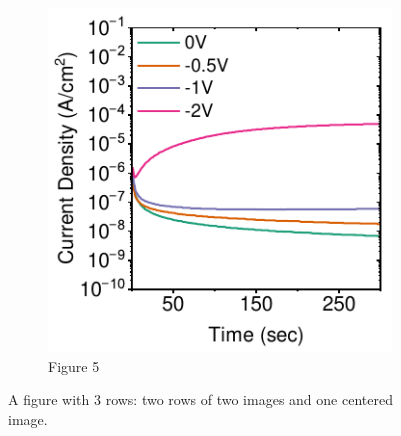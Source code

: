 \begin{figure}[htbp]
    \vspace{1em} %

    \begin{subfigure}[b]{0.45\textwidth}
        \centering
        \includegraphics[width=\textwidth]{chapters/material_properties/images/Steady-State-plot.pdf}
        \caption{Figure 5}
    \end{subfigure}

    \caption{A figure with 3 rows: two rows of two images and one centered image.}
    \label{fig:three_rows}
\end{figure}


